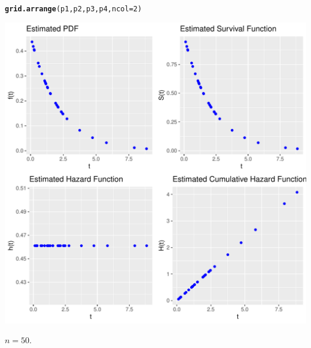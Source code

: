 \documentclass[11pt, a4paper]{article}\usepackage[]{graphicx}\usepackage[]{xcolor}
\makeatletter
\def\maxwidth{ %
  \ifdim\Gin@nat@width>\linewidth
    \linewidth
  \else
    \Gin@nat@width
  \fi
}
\newcommand{\hlnum}[1]{\textcolor[rgb]{0.686,0.059,0.569}{#1}}%
\newcommand{\hldef}[1]{\textcolor[rgb]{0.345,0.345,0.345}{#1}}%
\newcommand{\hlkwc}[1]{\textcolor[rgb]{0.333,0.667,0.333}{#1}}%
\newcommand{\hlkwd}[1]{\textcolor[rgb]{0.737,0.353,0.396}{\textbf{#1}}}%
\newenvironment{kframe}{%
 \def\at@end@of@kframe{}%
 \ifinner\ifhmode%
  \def\at@end@of@kframe{\end{minipage}}%
  \begin{minipage}{\columnwidth}%
 \fi\fi%
 \def\FrameCommand##1{\hskip\@totalleftmargin \hskip-\fboxsep
 \colorbox{shadecolor}{##1}\hskip-\fboxsep
     \hskip-\linewidth \hskip-\@totalleftmargin \hskip\columnwidth}%
 \MakeFramed {\advance\hsize-\width
   \@totalleftmargin\z@ \linewidth\hsize
   \@setminipage}}%
 {\par\unskip\endMakeFramed%
 \at@end@of@kframe}
\newenvironment{knitrout}{}{} %
\makeatother
\begin{document}
\begin{knitrout}
\color{fgcolor}\begin{kframe}
\begin{alltt}
\hlkwd{grid.arrange}\hldef{(p1, p2, p3, p4,} \hlkwc{ncol} \hldef{=} \hlnum{2}\hldef{)}
\end{alltt}
\end{kframe}
\includegraphics[width=\maxwidth]{figure/unnamed-chunk-17-1} 
\end{knitrout}

 $n = 50$.
\end{document}
